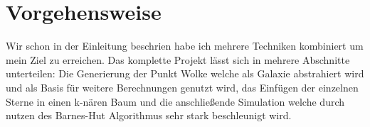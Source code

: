 \section{Vorgehensweise}
Wir schon in der Einleitung beschrien habe ich mehrere Techniken kombiniert um
mein Ziel zu erreichen. Das komplette Projekt lässt sich in mehrere Abschnitte
unterteilen: Die Generierung der Punkt Wolke welche als Galaxie abstrahiert
wird und als Basis für weitere Berechnungen genutzt wird, das Einfügen der
einzelnen Sterne in einen k-nären Baum und die anschließende Simulation welche
durch nutzen des Barnes-Hut Algorithmus sehr stark beschleunigt wird.
